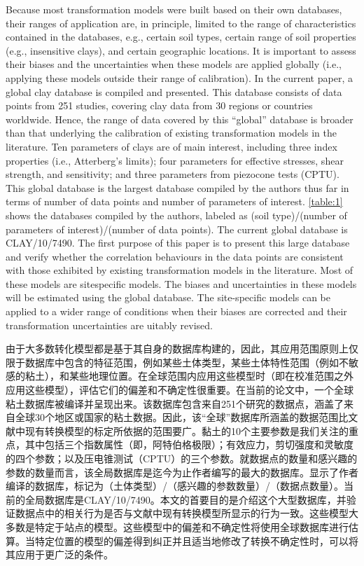 \begin{paracol}{2}
    Because most transformation models were built based on their own databases, their ranges of application are, in principle, limited to the range of characteristics contained in the databases, e.g., certain soil types, certain range of soil properties (e.g., insensitive clays), and certain geographic locations. It is important to assess their biases and the uncertainties when these models are applied globally (i.e., applying these models outside their range of calibration). In the current paper, a global clay database is compiled and presented. This database consists of data points from 251 studies, covering clay data from 30 regions or countries worldwide. Hence, the range of data covered by this “global” database is broader than that underlying the calibration of existing transformation models in the literature. Ten parameters of clays are of main interest, including three index properties (i.e., Atterberg’s limits); four parameters for effective stresses, shear strength, and sensitivity; and three parameters from piezocone tests (CPTU). This global database is the largest database compiled by the authors thus far in terms of number of data points and number of parameters of interest. \autoref{table:1} shows the databases compiled by the authors, labeled as (soil type)/(number of parameters of interest)/(number of data points). The current global database is CLAY/10/7490. The first purpose of this paper is to present this large database and verify whether the correlation behaviours in the data points are consistent with those exhibited by existing transformation models in the literature. Most of these models are sitespecific models. The biases and uncertainties in these models will be estimated using the global database. The site-specific models can be applied to a wider range of conditions when their biases are corrected and their transformation uncertainties are  uitably revised.

    \switchcolumn

    由于大多数转化模型都是基于其自身的数据库构建的，因此，其应用范围原则上仅限于数据库中包含的特征范围，例如某些土体类型，某些土体特性范围（例如不敏感的粘土），和某些地理位置。在全球范围内应用这些模型时（即在校准范围之外应用这些模型），评估它们的偏差和不确定性很重要。在当前的论文中，一个全球粘土数据库被编译并呈现出来。该数据库包含来自251个研究的数据点，涵盖了来自全球30个地区或国家的粘土数据。因此，该“全球”数据库所涵盖的数据范围比文献中现有转换模型的标定所依据的范围要广。黏土的10个主要参数是我们关注的重点，其中包括三个指数属性（即，阿特伯格极限）；有效应力，剪切强度和灵敏度的四个参数；以及压电锥测试（CPTU）的三个参数。就数据点的数量和感兴趣的参数的数量而言，该全局数据库是迄今为止作者编写的最大的数据库。显示了作者编译的数据库，标记为（土体类型）/（感兴趣的参数数量）/（数据点数量）。当前的全局数据库是CLAY/10/7490。本文的首要目的是介绍这个大型数据库，并验证数据点中的相关行为是否与文献中现有转换模型所显示的行为一致。这些模型大多数是特定于站点的模型。这些模型中的偏差和不确定性将使用全球数据库进行估算。当特定位置的模型的偏差得到纠正并且适当地修改了转换不确定性时，可以将其应用于更广泛的条件。


\end{paracol}
